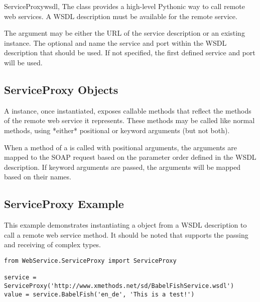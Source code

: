 \begin{classdesc}{ServiceProxy}{wsdl,}
The  class provides a high-level Pythonic way to 
call remote web services. A WSDL description must be available for the 
remote service.

The  argument may be either the URL of the service description 
or an existing  instance. The optional  and 
 name the service and port within the WSDL description that 
should be used. If not specified, the first defined service and port 
will be used.
\end{classdesc}


\subsection{ServiceProxy Objects}

A  instance, once instantiated, exposes callable 
methods that reflect the methods of the remote web service it 
represents. These methods may be called like normal methods, using 
*either* positional or keyword arguments (but not both).

When a method of a  is called with positional 
arguments, the arguments are mapped to the SOAP request based on 
the parameter order defined in the WSDL description. If keyword 
arguments are passed, the arguments will be mapped based on their 
names.


\subsection{ServiceProxy Example}

This example demonstrates instantiating a  object 
from a WSDL description to call a remote web service method.  It should be
noted that  supports the passing and receiving of complex
types.

\begin{verbatim}
from WebService.ServiceProxy import ServiceProxy

service = ServiceProxy('http://www.xmethods.net/sd/BabelFishService.wsdl')
value = service.BabelFish('en_de', 'This is a test!')
\end{verbatim}



